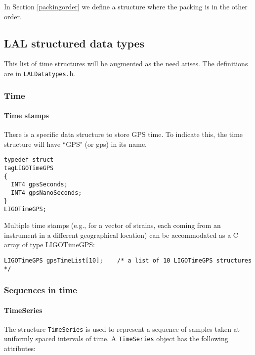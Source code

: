 \documentclass[]{ligodcc}
\renewcommand{\texttt}[1]{{\ttfamily\color{blue}#1}}
\begin{document}
In Section \ref{packingorder} we define a structure where the packing
is in the other order.

\subsection{LAL structured data types}
\label{structured}

This list of time structures will be augmented as the need arises. The
definitions are in {\tt LALDatatypes.h}.


\subsubsection{Time}

\paragraph{Time stamps \\}

There is a specific data structure to store GPS time. To indicate
this, the time structure will have ``GPS" (or gps) in its name. 

{\footnotesize
\begin{verbatim}
typedef struct
tagLIGOTimeGPS
{
  INT4 gpsSeconds;
  INT4 gpsNanoSeconds;
}
LIGOTimeGPS;
\end{verbatim}}

Multiple time stamps (e.g., for a vector of strains, each coming from
an instrument in a different geographical location) can be
accommodated as a C array of type LIGOTimeGPS:
{\footnotesize
\begin{verbatim}
LIGOTimeGPS gpsTimeList[10];	/* a list of 10 LIGOTimeGPS structures */
\end{verbatim}}

\subsubsection{Sequences in time}


\paragraph{{\texttt {TimeSeries}} \\}

The structure {\tt TimeSeries} is used to represent a sequence of samples
taken at uniformly spaced intervals of time. A {\tt TimeSeries} object has
the following attributes:
\end{document}
